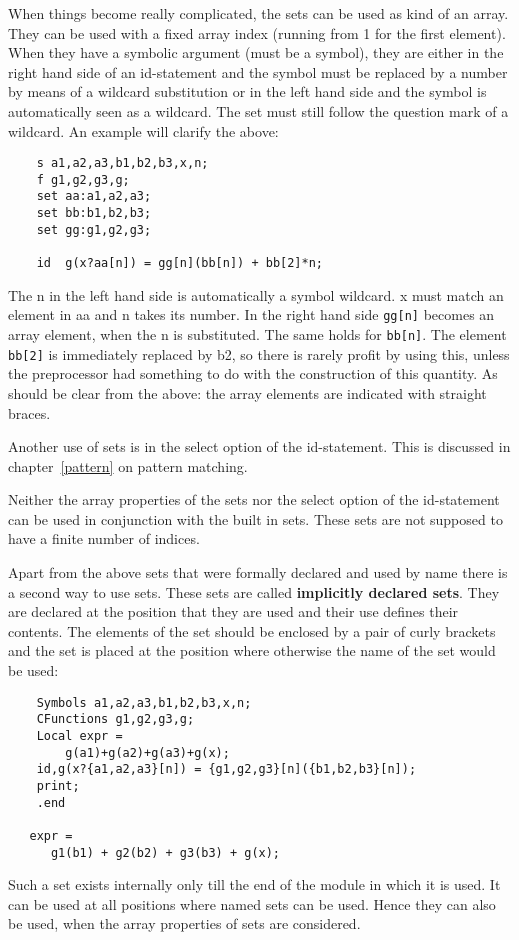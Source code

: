 When things become really complicated, the sets can be 
used as kind of an array. They can be used with a fixed array index 
(running from 1 for the first element). When they have a symbolic argument 
(must be a symbol), they are either in the right hand side of an 
id-statement and the symbol must be replaced by a number by means of a 
wildcard substitution or in the left hand side and the symbol is 
automatically seen as a wildcard. The set must still follow the question 
mark of a wildcard. An example will clarify the above:
\begin{verbatim}
    s a1,a2,a3,b1,b2,b3,x,n;
    f g1,g2,g3,g;
    set aa:a1,a2,a3;
    set bb:b1,b2,b3;
    set gg:g1,g2,g3;
   
    id  g(x?aa[n]) = gg[n](bb[n]) + bb[2]*n;
\end{verbatim}
The n in the left hand side is automatically a symbol wildcard. x must 
match an element in aa and n takes its number. In the right hand side 
\verb:gg[n]: becomes an array element, when the n is substituted. The 
same holds for \verb:bb[n]:. The element \verb:bb[2]: is immediately 
replaced by b2, so there is rarely profit by using this, unless the 
preprocessor had something to do with the construction of this 
quantity. As should be clear from the above: the array elements are 
indicated with straight braces. 

Another use of sets is in the select  
option of the id-statement. This is discussed in 
chapter~\ref{pattern} on pattern matching. 

Neither the array properties of the sets nor the select option of the 
id-statement can be used in conjunction with the built in sets. These 
sets are not supposed to have a finite number of indices.

Apart from the above sets that were formally declared and used by name 
there is a second way to use sets. These sets are called {\bf implicitly 
declared sets}. They are declared at the 
position that they are used and their use defines their contents. The 
elements of the set should be enclosed by a pair of curly 
brackets and the set is placed at the position where 
otherwise the name of the set would be used:
\begin{verbatim}
    Symbols a1,a2,a3,b1,b2,b3,x,n;
    CFunctions g1,g2,g3,g;
    Local expr =
        g(a1)+g(a2)+g(a3)+g(x);
    id,g(x?{a1,a2,a3}[n]) = {g1,g2,g3}[n]({b1,b2,b3}[n]);
    print;
    .end

   expr =
      g1(b1) + g2(b2) + g3(b3) + g(x);
\end{verbatim}
Such a set exists internally only till the end of the module in which it 
is used. It can be used at all positions where named sets can be used. 
Hence they can also be used, when the array properties of sets are 
considered.


